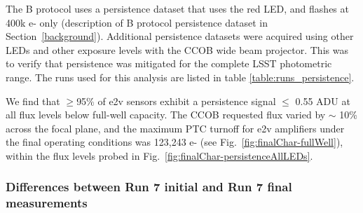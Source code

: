 The B protocol uses a persistence dataset that uses the red LED, and flashes at 400k e- only (description of B protocol persistence dataset in Section~\ref{background}). Additional persistence datasets were acquired using other LEDs and other exposure levels with the CCOB wide beam projector. This was to verify that persistence was mitigated for the complete LSST photometric range. The runs used for this analysis are listed in table \ref{table:runs_persistence}. 

We find that $\geq$95\% of e2v sensors exhibit a persistence signal $\leq$ 0.55 ADU at all flux levels below full-well capacity. The CCOB requested flux varied by $\sim$ 10\% across the focal plane, and the maximum PTC turnoff for e2v amplifiers under the final operating conditions was 123,243 e- (see Fig.~\ref{fig:finalChar-fullWell}), within the flux levels probed in Fig.~\ref{fig:finalChar-persistenceAllLEDs}.

\subsubsection{Differences between Run 7 initial and Run 7 final measurements}\label{final-differences-from-previous-runs}

